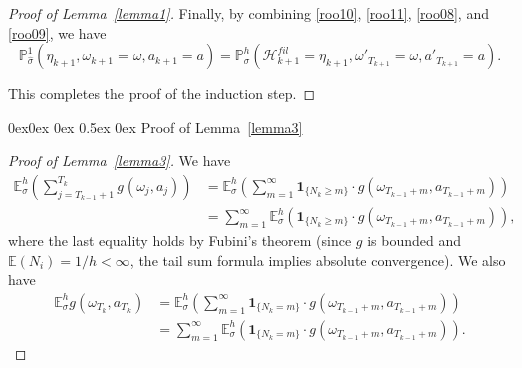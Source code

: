 \documentclass[english,openary,11pt]{article}
\makeatletter
\renewcommand\subsection{\@startsection{subsection}{2}{\z@}%
                                     {0ex\@plus 0ex \@minus 0ex}%
                                     {0.5ex \@plus 0ex}%
                                     {\normalfont\Large\bfseries}}%
\theoremstyle{definition}
\newcommand{\E}{\mathbb{E}}
\renewcommand{\P}{\mathbb{P}}
\makeatother
\begin{document}
\begin{proof}[Proof of Lemma~\ref{lemma1}]
Finally, by combining \eqref{roo10}, \eqref{roo11}, \eqref{roo08}, and \eqref{roo09}, we have
$$\P_{\widehat \sigma}^1(\eta_{k+1}, \omega_{k+1} = \omega, a_{k+1} = a) = 
\P_{\sigma}^h(\mathcal H^{fil}_{k+1} = \eta_{k+1}, \omega'_{T_{k+1}} = \omega, a'_{T_{k+1}} = a).$$

This completes the proof of the induction step.
\end{proof}

\subsection{Proof of Lemma~\ref{lemma3}}

\begin{proof}[Proof of Lemma~\ref{lemma3}]
We have
\begin{equation}
\begin{aligned}
\E_{\sigma}^h \left(\sum_{j=T_{k-1} + 1}^{T_k} g(\omega_j, a_j) \right) &= 
\E_{\sigma}^h \left(\sum_{m = 1}^{\infty} \mathbf{1}_{\{N_k \ge m\}} \cdot g(\omega_{T_{k-1} + m}, a_{T_{k-1} + m})\right) \\
&= \sum_{m = 1}^{\infty}  \E_{\sigma}^h \left(\mathbf{1}_{\{N_k \ge m\}} \cdot g(\omega_{T_{k-1} + m}, a_{T_{k-1} + m})\right),
\end{aligned}
\label{hoho1}
\end{equation}
where the last equality holds by Fubini's theorem (since $g$ is bounded and $\E(N_i) = 1/h < \infty$, the tail sum formula implies absolute convergence). We also have
\begin{equation}
\begin{aligned}
\E_\sigma^h g(\omega_{T_k}, a_{T_k}) &= 
\E_{\sigma}^h \left(\sum_{m = 1}^{\infty} \mathbf{1}_{\{N_k = m\}} \cdot g(\omega_{T_{k-1} + m}, a_{T_{k-1} + m})\right) \\
&= \sum_{m = 1}^{\infty} \E_{\sigma}^h \left( \mathbf{1}_{\{N_k = m\}} \cdot g(\omega_{T_{k-1} + m}, a_{T_{k-1} + m})\right).
\end{aligned}
\label{hoho2}
\end{equation}


\end{proof}
\end{document}
